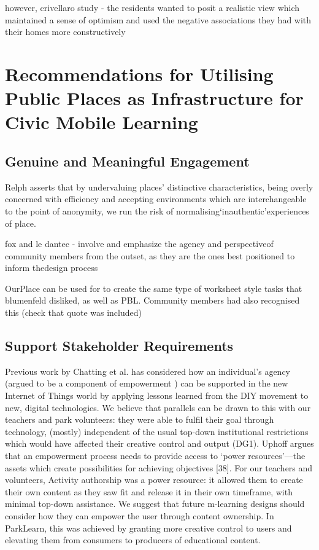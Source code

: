 however, crivellaro study - the residents wanted to posit a realistic view which maintained a sense of optimism and used the negative associations they had with their homes more constructively

\section{Recommendations for Utilising Public Places as Infrastructure for Civic Mobile Learning}

\subsection{Genuine and Meaningful Engagement}

Relph asserts that by undervaluing places’ distinctive characteristics, being overly concerned with efficiency and accepting environments which are interchangeable to the point of anonymity, we run the risk of normalising‘inauthentic’experiences of place.

fox and le dantec - involve and emphasize the agency and perspectiveof community members from the outset, as they are the ones best positioned to inform thedesign process

OurPlace can be used for to create the same type of worksheet style tasks that blumenfeld disliked, as well as PBL. Community members had also recognised this (check that quote was included) 

\subsection{Support Stakeholder Requirements}

Previous work by Chatting et al. \citep{Chatting2017} has considered how an individual’s agency (argued to be a component of empowerment \citep{Ibrahim2007}) can be supported in the new Internet of Things world by applying lessons learned from the DIY movement to new, digital technologies. We believe that parallels can be drawn to this with our teachers and park volunteers: they were able to fulfil their goal through technology, (mostly) independent of the usual top-down institutional restrictions which would have affected their creative control and output (DG1). Uphoff argues that an empowerment process needs to provide access to ‘power resources’—the assets which create possibilities for achieving objectives [38]. For our teachers and volunteers, Activity authorship was a power resource: it allowed them to create their own content as they saw fit and release it in their own timeframe, with minimal top-down assistance. We suggest that future m-learning designs should consider how they can empower the user through content ownership. In ParkLearn, this was achieved by granting more creative control to users and elevating them from consumers to producers of educational content.

